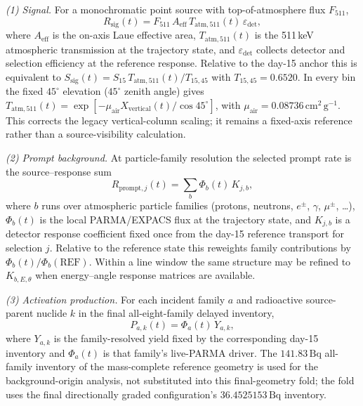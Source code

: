 \documentclass[11pt]{article}
\begin{document}
\emph{(1) Signal.} For a monochromatic point source with top-of-atmosphere flux $F_{511}$,
\begin{equation}
  R_{\mathrm{sig}}(t)=F_{511}\,A_{\mathrm{eff}}\,T_{\mathrm{atm},511}(t)\,\varepsilon_{\mathrm{det}},
  \label{eq:mission_signal}
\end{equation}
where $A_{\mathrm{eff}}$ is the on-axis Laue effective area, $T_{\mathrm{atm},511}(t)$ is the 511\,keV atmospheric transmission at the trajectory state, and $\varepsilon_{\mathrm{det}}$ collects detector and selection efficiency at the reference response. Relative to the day-15 anchor this is equivalent to
$S_{\mathrm{sig}}(t)=S_{15}\,T_{\mathrm{atm},511}(t)/T_{15,45}$ with
$T_{15,45}=0.6520$. In every bin the fixed $45^\circ$ elevation
($45^\circ$ zenith angle) gives
$T_{\mathrm{atm},511}(t)=\exp[-\mu_{\mathrm{air}}X_{\mathrm{vertical}}(t)/\cos45^\circ]$,
with $\mu_{\mathrm{air}}=0.08736\,\mathrm{cm^2\,g^{-1}}$. This corrects the
legacy vertical-column scaling; it remains a fixed-axis reference rather than a
source-visibility calculation.

\emph{(2) Prompt background.} At particle-family resolution the selected prompt rate is the source--response sum
\begin{equation}
  R_{\mathrm{prompt},j}(t)=\sum_{b}\Phi_{b}(t)\,K_{j,b},
  \label{eq:prompt_source_response}
\end{equation}
where $b$ runs over atmospheric particle families (protons, neutrons, $e^{\pm}$, $\gamma$, $\mu^{\pm}$, \ldots), $\Phi_{b}(t)$ is the local PARMA/EXPACS flux at the trajectory state, and $K_{j,b}$ is a detector response coefficient fixed once from the day-15 reference transport for selection $j$. Relative to the reference state this reweights family contributions by $\Phi_{b}(t)/\Phi_{b}(\mathrm{REF})$. Within a line window the same structure may be refined to $K_{b,E,\theta}$ when energy--angle response matrices are available.

\emph{(3) Activation production.} For each incident family $a$ and radioactive
source-parent nuclide $k$ in the final all-eight-family delayed inventory,
\begin{equation}
  P_{a,k}(t)=\Phi_{a}(t)\,Y_{a,k},
  \label{eq:activation_production}
\end{equation}
where $Y_{a,k}$ is the family-resolved yield fixed by the corresponding day-15
inventory and $\Phi_a(t)$ is that family's live-PARMA driver. The $141.83\,\mathrm{Bq}$
all-family inventory of the mass-complete reference geometry is used for the
background-origin analysis, not substituted into this final-geometry fold; the
fold uses the final directionally graded configuration's
$36.4525153\,\mathrm{Bq}$ inventory.
\end{document}
